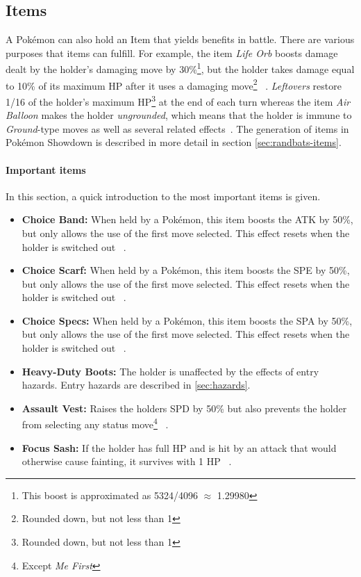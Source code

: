 \subsection{Items}
\label{sec:items}
A Pokémon can also hold an Item that yields benefits in battle. There are various purposes that items 
can fulfill. For example, the item \textit{Life Orb} boosts damage dealt by the holder's damaging move
by 30\%\footnote{This boost is approximated as 5324/4096 $\approx$ 1.29980}, but the holder takes
damage equal to 10\% of its maximum \ac{HP} after it uses a damaging move\footnote{Rounded down, 
but not less than 1} ~\autocite{Bulbapedia:LifeOrb}. \textit{Leftovers} restore 1/16 of the holder's
maximum \ac{HP}\footnote{Rounded down, but not less than 1} at the end of each turn whereas the item
\textit{Air Balloon} makes the holder \textit{ungrounded}, which means that the holder is immune to
\textit{Ground}-type moves as well as several related effects~\autocite{Bulbapedia:AirBalloon}. The 
generation of items in Pokémon Showdown is described in more detail in section \ref{sec:randbats-items}.
\paragraph{Important items}
\label{sec:Important-items}
In this section, a quick introduction to the most important items is given.
\begin{itemize}
	\item \textbf{Choice Band:} When held by a Pokémon, this item boosts the \ac{ATK} by 50\%, but only
	allows the use of the first move selected. This effect resets when the holder is switched out ~\autocite{Bulbapedia:ChoiceBand}. 
	\item \textbf{Choice Scarf:} When held by a Pokémon, this item boosts the \ac{SPE} by 50\%, but only
	allows the use of the first move selected. This effect resets when the holder is switched out ~\autocite{Bulbapedia:ChoiceScarf}. 
	\item \textbf{Choice Specs:} When held by a Pokémon, this item boosts the \ac{SPA} by 50\%, but only
	allows the use of the first move selected. This effect resets when the holder is switched out ~\autocite{Bulbapedia:ChoiceSpecs}. 
	\item \textbf{Heavy-Duty Boots:} The holder is unaffected by the effects of entry hazards. Entry hazards are described 
	in \ref{sec:hazards}.
	\item \textbf{Assault Vest:} Raises the holders \ac{SPD} by 50\% but also prevents the holder from selecting any 
	status move\footnote{Except \textit{Me First}} ~\autocite{Bulbapedia:AssaultVest}.
	\item \textbf{Focus Sash:} If the holder has full \ac{HP} and is hit by an attack that would otherwise cause fainting,
	it survives with 1 \ac{HP} ~\autocite{Bulbapedia:FocusSash}.
\end{itemize}

